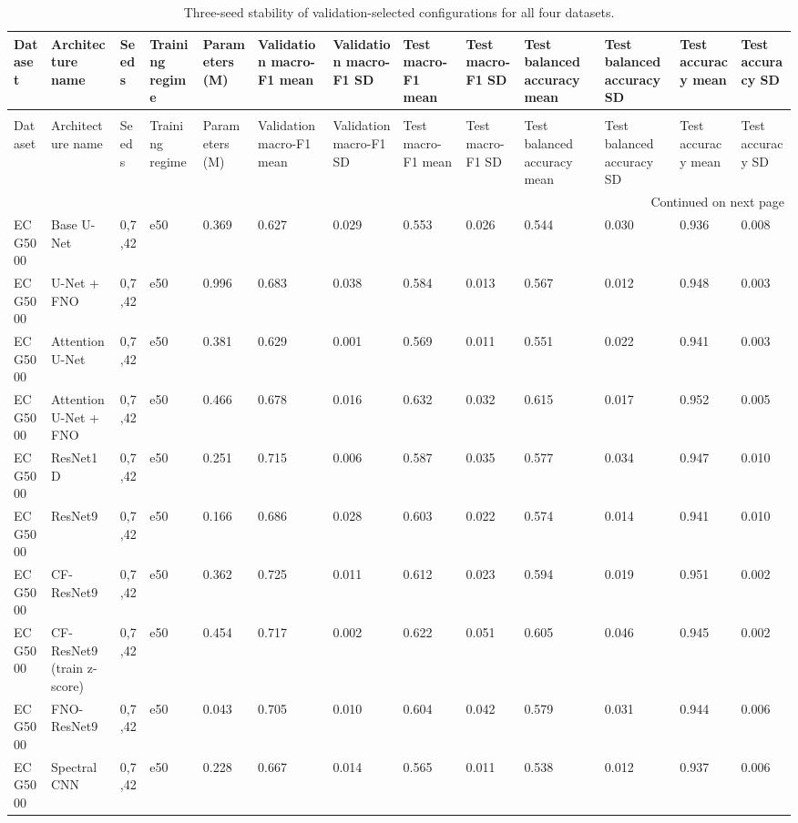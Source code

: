 \begin{longtable}{lllllllllllll}
\caption{Three-seed stability of validation-selected configurations for all four datasets.} \label{tab:seed_stability_all_datasets} \\
\toprule
Dataset & Architecture name & Seeds & Training regime & Parameters (M) & Validation macro-F1 mean & Validation macro-F1 SD & Test macro-F1 mean & Test macro-F1 SD & Test balanced accuracy mean & Test balanced accuracy SD & Test accuracy mean & Test accuracy SD \\
\midrule
\endfirsthead
\caption[]{Three-seed stability of validation-selected configurations for all four datasets.} \\
\toprule
Dataset & Architecture name & Seeds & Training regime & Parameters (M) & Validation macro-F1 mean & Validation macro-F1 SD & Test macro-F1 mean & Test macro-F1 SD & Test balanced accuracy mean & Test balanced accuracy SD & Test accuracy mean & Test accuracy SD \\
\midrule
\endhead
\midrule
\multicolumn{13}{r}{Continued on next page} \\
\midrule
\endfoot
\bottomrule
\endlastfoot
ECG5000 & Base U-Net & 0,7,42 & e50 & 0.369 & 0.627 & 0.029 & 0.553 & 0.026 & 0.544 & 0.030 & 0.936 & 0.008 \\
ECG5000 & U-Net + FNO & 0,7,42 & e50 & 0.996 & 0.683 & 0.038 & 0.584 & 0.013 & 0.567 & 0.012 & 0.948 & 0.003 \\
ECG5000 & Attention U-Net & 0,7,42 & e50 & 0.381 & 0.629 & 0.001 & 0.569 & 0.011 & 0.551 & 0.022 & 0.941 & 0.003 \\
ECG5000 & Attention U-Net + FNO & 0,7,42 & e50 & 0.466 & 0.678 & 0.016 & 0.632 & 0.032 & 0.615 & 0.017 & 0.952 & 0.005 \\
ECG5000 & ResNet1D & 0,7,42 & e50 & 0.251 & 0.715 & 0.006 & 0.587 & 0.035 & 0.577 & 0.034 & 0.947 & 0.010 \\
ECG5000 & ResNet9 & 0,7,42 & e50 & 0.166 & 0.686 & 0.028 & 0.603 & 0.022 & 0.574 & 0.014 & 0.941 & 0.010 \\
ECG5000 & CF-ResNet9 & 0,7,42 & e50 & 0.362 & 0.725 & 0.011 & 0.612 & 0.023 & 0.594 & 0.019 & 0.951 & 0.002 \\
ECG5000 & CF-ResNet9 (train z-score) & 0,7,42 & e50 & 0.454 & 0.717 & 0.002 & 0.622 & 0.051 & 0.605 & 0.046 & 0.945 & 0.002 \\
ECG5000 & FNO-ResNet9 & 0,7,42 & e50 & 0.043 & 0.705 & 0.010 & 0.604 & 0.042 & 0.579 & 0.031 & 0.944 & 0.006 \\
ECG5000 & Spectral CNN & 0,7,42 & e50 & 0.228 & 0.667 & 0.014 & 0.565 & 0.011 & 0.538 & 0.012 & 0.937 & 0.006 \\

\end{longtable}
